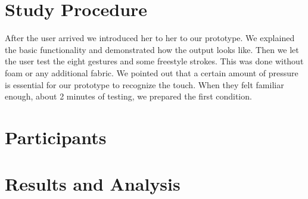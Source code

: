 \section{Study Procedure}
After the user arrived we introduced her to her to our prototype. We explained the basic functionality and demonstrated how the output looks like. Then we let the user test the eight gestures and some freestyle strokes. This was done without foam or any additional fabric. We pointed out that a certain amount of pressure is essential for our prototype to recognize the touch. When they felt familiar enough, about 2 minutes of testing, we prepared the first condition. \\

\section{Participants}

\section{Results and Analysis}


